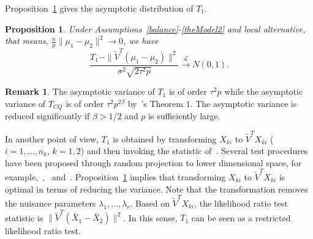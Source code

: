 \documentclass[review]{elsarticle}
\theoremstyle{plain}
\newtheorem{proposition}{\quad\quad Proposition}
\theoremstyle{definition}
\newtheorem{remark}{\quad\quad Remark}
\theoremstyle{remark}
\begin{document}

Proposition~\ref{oracleTheorem} gives the asymptotic distribution of $T_1$.

\begin{proposition}\label{oracleTheorem}
    Under Assumptions~\ref{balance}-\ref{theModel2} and local alternative, that means, $\frac{n}{p}\|\mu_1-\mu_2\|^2\to 0$, we have 
    \begin{equation*}
        \frac{T_1-\|\tilde{V}^T(\mu_1-\mu_2)\|^2}
        {\sigma^2\sqrt{2\tau^2 p}}\xrightarrow{\mathcal{L}}N(0,1).
    \end{equation*}
\end{proposition}

\begin{remark}
    The asymptotic variance of $T_1$ is of order $\tau^2 p$ while the asymptotic variance of $T_{CQ}$ is of order $\tau^2 p^{2\beta}$ by~\cite{Chen2010A}'s Theorem $1$.
    The asymptotic variance is reduced significantly if $\beta>1/2$ and $p$ is sufficiently large.
\end{remark}


In another point of view,
$T_1$ is obtained by transforming $X_{ki}$ to $\tilde{V}^T X_{ki}$ ($i=1,\ldots, n_k$, $k=1,2$) and then invoking the statistic of~\cite{Chen2010A}.
Several test procedures have been proposed through random projection to lower dimensional space, for example,~\cite{Lopes2015A},~\cite{Thulin2014A} and~\cite{Srivastava2014RAPTT}.
Proposition~\ref{oracleTheorem} implies that transforming $X_{ki}$ to $\tilde{V}^T X_{ki}$ is optimal in terms of reducing the variance. Note that the transformation removes the nuisance parameters $\lambda_1,\ldots,\lambda_r$. Based on $\tilde{V}^T X_{ki}$, the likelihood ratio test statistic is
    $\|\tilde{V}^T (\bar{X}_1-\bar{X}_2)\|^2$. In this sense, $T_1$ can be seen as a restricted likelihood ratio test.
\end{document}
